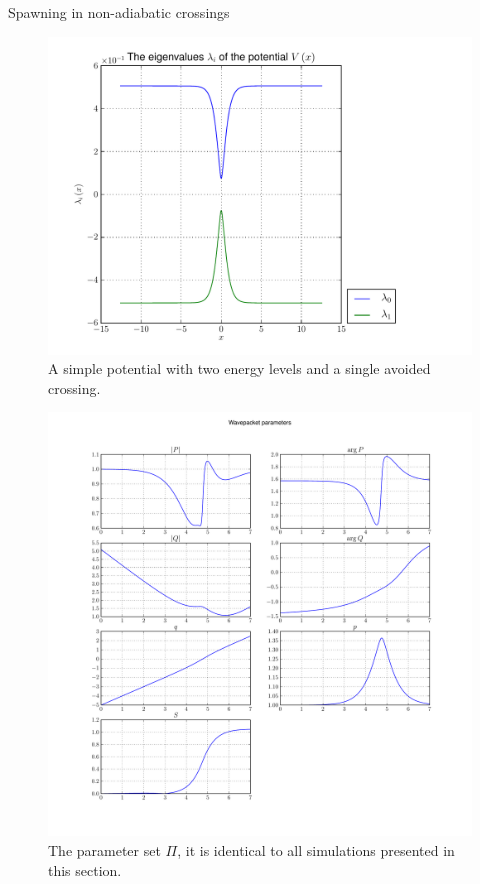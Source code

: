 \begin{chapter}{Spawning in non-adiabatic crossings}
\begin{figure}[h!]
  \centering
  \includegraphics[width=0.7\linewidth]{./figures/avoided_crossing.pdf}
  \caption{A simple potential with two energy levels and a single avoided crossing.}
  \label{fig:avoided_crossing}
\end{figure}


\begin{figure}
  \centering
  \includegraphics[width=\the\linewidth]{./figures/delta_gap_phi0/wavepacket_parameters_abs_ang_block0.pdf}
  \caption{The parameter set $\Pi$, it is identical to all simulations presented in this section.}
  \label{fig:basic_delta_gap_parameters}
\end{figure}



\end{chapter}
